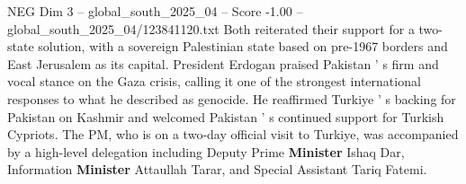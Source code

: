 \begin{textsample}{NEG Dim 3 – global\_south\_2025\_04 – Score -1.00 – global\_south\_2025\_04/123841120.txt}
Both reiterated their support for a two-state solution, with a sovereign Palestinian state based on pre-1967 borders and East Jerusalem as its capital.
President Erdogan praised Pakistan ' s firm and vocal stance on the Gaza crisis, calling it one of the strongest international responses to what he described as genocide.
He reaffirmed Turkiye ' s backing for Pakistan on Kashmir and welcomed Pakistan ' s continued support for Turkish Cypriots.
The PM, who is on a two-day official visit to Turkiye, was accompanied by a high-level delegation including Deputy Prime \textbf{Minister} Ishaq Dar, Information \textbf{Minister} Attaullah Tarar, and Special Assistant Tariq Fatemi.

\end{textsample}
